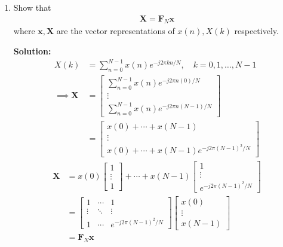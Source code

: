 \documentclass[journal,12pt,twocolumn]{IEEEtran}
\newcommand{\solution}{\noindent \textbf{Solution: }}
\let\vec\mathbf
\numberwithin{equation}{section}
\renewcommand\thesection{\arabic{section}}
\newcommand{\mymat}[1]{\ensuremath{\begin{bmatrix}#1\end{bmatrix}}}
\renewcommand\thesection{\arabic{section}}
\begin{document}
\begin{enumerate}[label=\arabic*.,ref=\thesection.\theenumi]
\item Show that 
    \begin{align}
	    \vec{X} = \vec{F}_N \vec{x}
	    \label{eq:dft-mat-def}
    \end{align}
		where $\vec{x}, \vec{X}$ are the vector representations of $x(n), X(k)$ respectively.
		
	\solution
	\begin{align}
        X(k) &= \sum_{n=0}^{N-1} x(n) e^{-j 2 \pi k n / N}, \quad k=0,1, \ldots, N-1 \\
        \implies \vec{X} &= \mymat{\sum_{n=0}^{N-1} x(n) e^{-j 2 \pi  n (0) / N} \\ \vdots \\ \sum_{n=0}^{N-1} x(n) e^{-j 2 \pi  n (N-1) / N}} \\
        &= \mymat{x(0) + \cdots + x(N-1) \\ \vdots \\ x(0) + \cdots + x(N-1) e^{-j 2 \pi (N-1)^2 / N}} 
    \end{align}
    \begin{align}
    		\vec{X} &= x(0) \mymat{1 \\ \vdots \\ 1} + \cdots + x(N-1)\mymat{1 \\ \vdots \\ e^{-j 2 \pi (N-1)^2 / N}} \\
    		&= \mymat{1 & \cdots & 1 \\ \vdots & \ddots & \vdots \\ 1 & \cdots & e^{-j 2 \pi (N-1)^2 / N}} \mymat{x(0) \\ \vdots \\ x(N-1)} \\
    		&= \vec{F}_N \vec{x}
    \end{align}
		

\end{enumerate}
\end{document}
